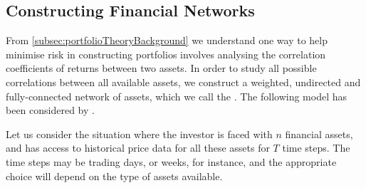 \subsection{Constructing Financial Networks}
\label{subsec:financialNetworksConstructionBackground}

From \cref{subsec:portfolioTheoryBackground} we understand one way to help minimise risk in constructing portfolios involves analysing the correlation coefficients of returns between two assets.
In order to study all possible correlations between all available assets, we construct a weighted, undirected and fully-connected network of assets, which we call the . The following model has been considered by \cite{PGR+99,OCK+02,OKK03,FPM+10,MG13}.

Let us consider the situation where the investor is faced with $n$ financial assets, and has access to historical price data for all these assets for $T$ time steps. The time steps may be trading days, or weeks, for instance, and the appropriate choice will depend on the type of assets available.

